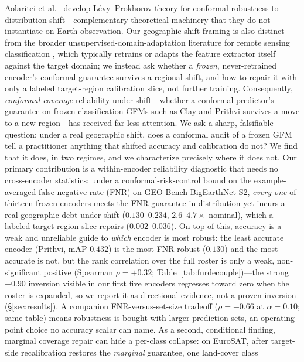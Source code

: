 \documentclass[journal]{IEEEtran}
\renewcommand{\_}{\textunderscore\allowbreak}
\begin{document}
Aolaritei et al.~\citep{aolaritei2025levyprokhorov} develop L\'evy--Prokhorov theory for conformal robustness to distribution
shift---complementary theoretical machinery that they do not instantiate on Earth observation.
Our geographic-shift framing is also distinct from the broader unsupervised-domain-adaptation literature for
remote sensing classification \citep{tuia2016domain,zhu2017deep}, which typically retrains or adapts the
feature extractor itself against the target domain; we instead ask whether a \emph{frozen}, never-retrained
encoder's conformal guarantee survives a regional shift, and how to repair it with only a labeled
target-region calibration slice, not further training.
Consequently, \emph{conformal coverage} reliability
under shift---whether a conformal predictor's guarantee \citep{vovk2005algorithmic,angelopoulos2023conformal} on frozen classification GFMs
such as Clay and Prithvi survives a move to a new
region---has received far less attention. We ask a sharp, falsifiable question: under a real geographic
shift, does a conformal audit of a frozen GFM tell a practitioner anything that shifted accuracy
and calibration do not? We find that it does, in two regimes, and we characterize precisely where it
does not. Our primary contribution is a within-encoder reliability diagnostic that needs no cross-encoder
statistics: under a conformal-risk-control \citep{angelopoulos2024crc} bound on the example-averaged
false-negative rate (FNR) on GEO-Bench BigEarthNet-S2, \emph{every one} of thirteen frozen encoders meets
the FNR guarantee in-distribution yet incurs a real geographic debt under shift ($0.130$--$0.234$,
$2.6$--$4.7\times$ nominal), which a labeled target-region slice repairs ($0.002$--$0.036$). On top of
this, accuracy is a weak and unreliable guide to \emph{which} encoder is most robust: the least accurate
encoder (Prithvi, mAP $0.432$) is the most FNR-robust ($0.130$) and the most accurate is not, but the
rank correlation over the full roster is only a weak, non-significant positive
(Spearman $\rho=+0.32$; Table~\ref{tab:fnrdecouple})---the strong
$+0.90$ inversion visible in our first five encoders regresses toward zero when the roster is expanded, so
we report it as directional evidence, not a proven inversion (\S\ref{sec:results}). A companion
FNR-versus-set-size tradeoff ($\rho=-0.66$ at $\alpha{=}0.10$; same table) means robustness
is bought with larger prediction sets, an operating-point choice no accuracy scalar can name.
As a second, conditional finding, marginal coverage repair can hide a per-class collapse:
on EuroSAT, after target-side recalibration restores the \emph{marginal} guarantee, one land-cover class
\end{document}
